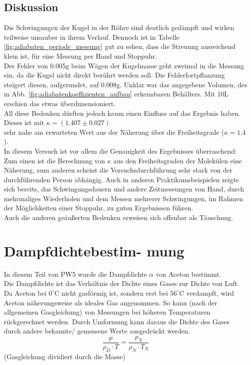 \documentclass[12pt,a4paper]{article}
\begin{document}
\begin{multicols}{2}
\subsection{Diskussion}
Die Schwingungen der Kugel in der Röhre sind deutlich gedämpft und wirken teilweise unsauber in ihrem Verlauf. Dennoch ist in Tabelle \ref{fig:adiabaten_periode_messung} gut zu sehen, dass die Streuung ausreichend klein ist, für eine Messung per Hand und Stoppuhr.\\
Der Fehler von 0.005g beim Wägen der Kugelmasse geht zweimal in die Messung ein, da die Kugel nicht direkt berührt werden soll. Die Fehlerfortpflanzung steigert diesen, aufgerundet, auf 0.008g. Unklar war das angegebene Volumen, des in Abb. \ref{fig:adiabatenkoeffizienten_aufbau} erkennbaren Behälters. Mit 10L erschien das etwas überdimensioniert.\\
All diese Bedenken dürften jedoch kaum einen Einfluss auf das Ergebnis haben.
Dieses ist mit $\kappa = (1.407 \pm 0.027)$ \\
sehr nahe am erwarteten Wert aus der Näherung über die Freiheitsgrade ($\kappa = 1.4$).\\
In diesem Versuch ist vor allem die Genauigkeit des Ergebnisses überraschend:\\
Zum einen ist die Berechnung von $\kappa$ aus den Freiheitsgraden der Molekülen eine Näherung, zum anderen scheint die Versuchsdurchführung sehr stark von der durchführenden Person abhängig.
Auch in anderen Praktikumsbeispielen zeigte sich bereits, das Schwingungsdauern und andere Zeitmessungen von Hand, durch mehrmaliges Wiederholen und dem Messen mehrerer Schwingungen, im Rahmen der Möglichkeiten einer Stoppuhr, zu guten Ergebnissen führen.\\
Auch die anderen geäußerten Bedenken erweisen sich offenbar als Täuschung.
\pagebreak





\section{Dampfdichtebestim- mung}

In diesem Teil von PW5 wurde die Dampfdichte $\alpha$ von Aceton bestimmt.\\
Die Dampfdichte ist das Verhältnis der Dichte eines Gases zur Dichte von Luft. Da Aceton bei $0 ^\circ$C nicht gasförmig ist, sondern erst bei $56^\circ$C verdampft, wird Aceton näherungsweise als ideales Gas angenommen. So kann (nach der allgemeinen Gasgleichung) von Messungen bei höheren Temperaturen rückgerechnet werden. Durch Umformung kann daraus die Dichte des Gases durch andere bekannte/ gemessene Werte ausgedrückt werden.
$$\frac{p}{\rho_D \cdot T}= \frac{p_N}{\rho_N \cdot T_N}$$ 
(Gasgleichung dividiert durch die Masse)\\
\end{multicols}
\end{document}
